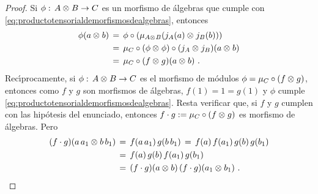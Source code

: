 \begin{proof}
	Si $\phi:\,A\otimes_{} B\rightarrow C$ es un morfismo de \'{a}lgebras que
	cumple con \eqref{eq:productotensorialdemorfismosdealgebras}, entonces
	\begin{align*}
		\phi (a\otimes_{} b) & \,=\,
			\phi\circ(\mu_{A\otimes_{} B}(j_A(a)\otimes_{} j_B(b))) \\
		& \,=\,\mu_C\circ (\phi\otimes_{}\phi)\circ
				(j_A\otimes_{} j_B)(a\otimes_{} b) \\
		& \,=\,\mu_C\circ (f\otimes_{} g)(a\otimes_{} b)
		\text{ .}
	\end{align*}
	Rec\'{\i}procamente, si $\phi:\,A\otimes_{} B\rightarrow C$ es el morfismo
	de m\'{o}dulos $\phi=\mu_C\circ (f\otimes_{} g)$, entonces como
	$f$ y $g$ son morfismos de \'{a}lgebras, $f(1)=1=g(1)$ y $\phi$ cumple
	\eqref{eq:productotensorialdemorfismosdealgebras}. Resta verificar que,
	si $f$ y $g$ cumplen con las hip\'{o}tesis del enunciado, entonces
	$f\cdot g:=\mu_C\circ (f\otimes_{} g)$ es morfismo de \'{a}lgebras. Pero
	\begin{align*}
		(f\cdot g)(a\,a_1\otimes_{} b\,b_1) & \,=\,f(a\,a_1)\,g(b\,b_1)
			\,=\,f(a)\,f(a_1)\,g(b)\,g(b_1) \\
		& \,=\, f(a)\,g(b)\,f(a_1)\,g(b_1) \\
		& \,=\, (f\cdot g)(a\otimes_{} b)\,(f\cdot g)(a_1\otimes_{} b_1)
		\text{ .}
	\end{align*}

\end{proof}
